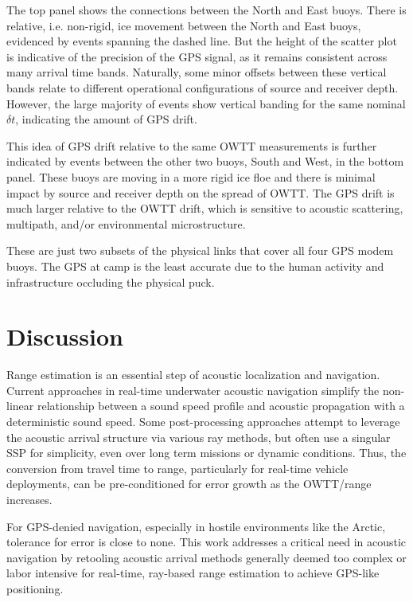 The top panel shows the connections between the North and East buoys.
There is relative, i.e. non-rigid, ice movement between the North and East buoys, evidenced by events spanning the dashed line.
But the height of the scatter plot is indicative of the precision of the GPS signal, as it remains consistent across many arrival time bands.
Naturally, some minor offsets between these vertical bands relate to different operational configurations of source and receiver depth.
However, the large majority of events show vertical banding for the same nominal $\delta t$, indicating the amount of GPS drift.

This idea of GPS drift relative to the same OWTT measurements is further indicated by events between the other two buoys, South and West, in the bottom panel.
These buoys are moving in a more rigid ice floe and there is minimal impact by source and receiver depth on the spread of OWTT.
The GPS drift is much larger relative to the OWTT drift, which is sensitive to acoustic scattering, multipath, and/or environmental microstructure.

These are just two subsets of the physical links that cover all four GPS modem buoys.
The GPS at camp is the least accurate due to the human activity and infrastructure occluding the physical puck.

\section{\label{sec:discussion} Discussion}

Range estimation is an essential step of acoustic localization and navigation.
Current approaches in real-time underwater acoustic navigation simplify the non-linear relationship between a sound speed profile and acoustic propagation with a deterministic sound speed.
Some post-processing approaches attempt to leverage the acoustic arrival structure via various ray methods, but often use a singular SSP for simplicity, even over long term missions or dynamic conditions.
Thus, the conversion from travel time to range, particularly for real-time vehicle deployments, can be pre-conditioned for error growth as the OWTT/range increases.

For GPS-denied navigation, especially in hostile environments like the Arctic, tolerance for error is close to none.
This work addresses a critical need in acoustic navigation by retooling acoustic arrival methods generally deemed too complex or labor intensive for real-time, ray-based range estimation to achieve GPS-like positioning.

